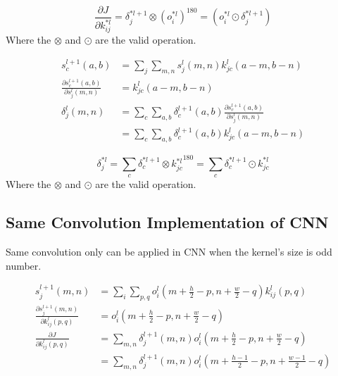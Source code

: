\documentclass[runningheads,openany]{xhlPaper}
\begin{document}
\begin{displaymath}
\frac{{\partial J}}{{\partial k_{ij}^{*l}}} = \delta _j^{*l + 1} \otimes {\left( {o_i^{*l}} \right)^{180}} = {\left( {o_i^{*l} \odot \delta _j^{*l + 1}} \right)}
\end{displaymath}
Where the $\otimes$ and $\odot$ are the valid operation. 

\begin{displaymath}
\begin{aligned}
s_c^{l + 1}(a,b) &= \sum\limits_j {\sum\limits_{m, n} {s_j^l(m,n)k_{jc}^l(a - m,b - n)} } \\
\frac{{\partial s_c^{l + 1}(a,b)}}{{\partial s_j^l(m,n)}} &= k_{jc}^l(a - m,b - n)\\
\delta _j^l(m,n) &= \sum\limits_c {\sum\limits_{a,b} {\delta _c^{l + 1}(a,b)\frac{{\partial s_c^{l + 1}(a,b)}}{{\partial s_j^l(m,n)}}} } \\
 &= \sum\limits_c {\sum\limits_{a,b} {\delta _c^{l + 1}(a,b)k_{jc}^l(a - m,b - n)} }
\end{aligned}
\end{displaymath}

\begin{displaymath}
\delta _j^{*l} = \sum\limits_c {\delta _c^{*l + 1} \otimes k{{_{jc}^{*l}}^{180}}}  = \sum\limits_c {\delta _c^{*l + 1} \odot k_{jc}^{*l}}
\end{displaymath}
Where the $\otimes$ and $\odot$ are the valid operation. 

\subsection{Same Convolution Implementation of CNN}
\label{sec:cnn_same_convolution_feedforwad}
Same convolution only can be applied in CNN when the kernel's size is odd number.


\begin{displaymath}
\begin{aligned}
s_j^{l + 1}(m,n) &= \sum\limits_i {\sum\limits_{p,q} {o_i^l(m + \frac{h}{2}- p,n + \frac{w}{2} - q)k_{ij}^l(p,q)} }\\
\frac{{\partial s_j^{l + 1}(m,n)}}{{\partial k_{ij}^{l}(p,q)}}&=o_i^l(m + \frac{h}{2}- p,n + \frac{w}{2}- q)\\
\frac{{\partial J}}{{\partial k_{ij}^l(p,q)}}&=\sum\limits_{m,n} {\delta _j^{l + 1}(m,n)o_i^l(m + \frac{h}{2}- p,n + \frac{w}{2}- q)}\\
&=\sum\limits_{m,n} {\delta _j^{l + 1}(m,n)o_i^l(m + \frac{h - 1}{2}- p,n + \frac{w - 1}{2}- q)}
\end{aligned}
\end{displaymath}
\end{document}
